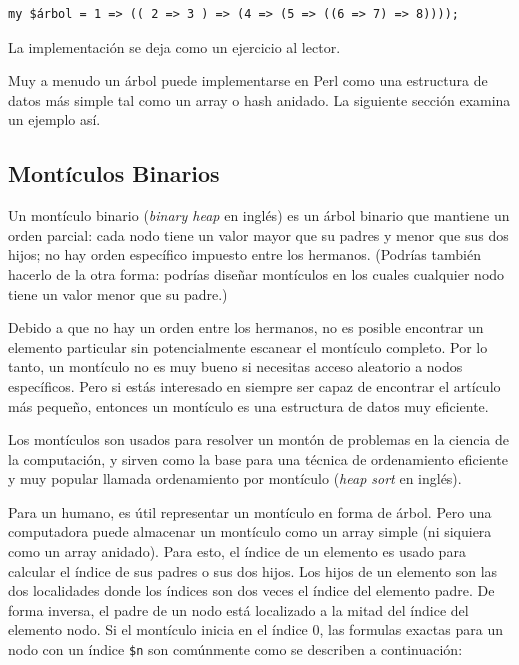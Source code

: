 \begin{verbatim}
my $árbol = 1 => (( 2 => 3 ) => (4 => (5 => ((6 => 7) => 8))));
\end{verbatim}

La implementación se deja como un ejercicio al lector. 

Muy a menudo un árbol puede implementarse en Perl como una
estructura de datos más simple tal como un array o hash anidado.
La siguiente sección examina un ejemplo así.

\subsection{Montículos Binarios}
\label{heap}

Un montículo binario (\emph{binary heap} en inglés) es un árbol binario
que mantiene un orden parcial: cada nodo tiene un valor mayor
que su padres y menor que sus dos hijos; no hay orden específico
impuesto entre los hermanos. (Podrías también hacerlo de la
otra forma: podrías diseñar montículos en los cuales
cualquier nodo tiene un valor menor que su padre.) 


Debido a que no hay un orden entre los hermanos, no es posible
encontrar un elemento particular sin potencialmente escanear el
montículo completo. Por lo tanto, un montículo no es muy bueno
si necesitas acceso aleatorio a nodos específicos. Pero si estás
interesado en siempre ser capaz de encontrar el artículo más
pequeño, entonces un montículo es una estructura de datos 
muy eficiente.

Los montículos son usados para resolver un montón de problemas
en la ciencia de la computación, y sirven como la base para una 
técnica de ordenamiento eficiente y muy popular llamada
ordenamiento por montículo (\emph{heap sort} en inglés).

Para un humano, es útil representar un montículo en forma
de árbol. Pero una computadora puede almacenar un montículo
como un array simple (ni siquiera como un array anidado).
Para esto, el índice de un elemento es usado para calcular
el índice de sus padres o sus dos hijos. Los hijos de un
elemento son las dos localidades donde los índices son 
dos veces el índice del elemento padre. De forma inversa,
el padre de un nodo está localizado a la mitad del índice
del elemento nodo. Si el montículo inicia en el índice 0, las
formulas exactas para un nodo con un índice \verb|$n| son
comúnmente como se describen a continuación:

